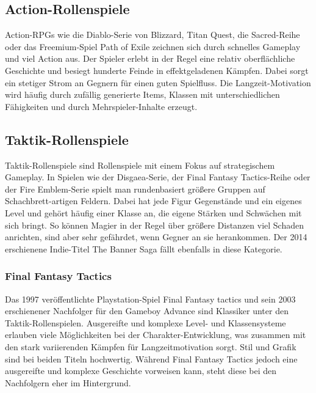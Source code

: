 \documentclass[extern,palatino]{cgBA}
\begin{document}
	\subsection{Action-Rollenspiele}
	Action-RPGs wie die Diablo-Serie von Blizzard, Titan Quest, die Sacred-Reihe oder das Freemium-Spiel Path of Exile zeichnen sich durch schnelles Gameplay und viel Action aus. Der Spieler erlebt in der Regel eine relativ oberflächliche Geschichte und besiegt hunderte Feinde in effektgeladenen Kämpfen. Dabei sorgt ein stetiger Strom an Gegnern für einen guten Spielfluss. Die Langzeit-Motivation wird häufig durch zufällig generierte Items, Klassen mit unterschiedlichen Fähigkeiten und durch Mehrspieler-Inhalte erzeugt.
	\subsection{Taktik-Rollenspiele}
	Taktik-Rollenspiele sind Rollenspiele mit einem Fokus auf strategischem Gameplay. In Spielen wie der Disgaea-Serie, der Final Fantasy Tactics-Reihe oder der Fire Emblem-Serie spielt man rundenbasiert größere Gruppen auf Schachbrett-artigen Feldern. Dabei hat jede Figur Gegenstände und ein eigenes Level und gehört häufig einer Klasse an, die eigene Stärken und Schwächen mit sich bringt. So können Magier in der Regel über größere Distanzen viel Schaden anrichten, sind aber sehr gefährdet, wenn Gegner an sie herankommen. Der 2014 erschienene Indie-Titel The Banner Saga fällt ebenfalls in diese Kategorie.
	\subsubsection{Final Fantasy Tactics}
	Das 1997 veröffentlichte Playstation-Spiel Final Fantasy tactics und sein 2003 erschienener Nachfolger für den Gameboy Advance sind Klassiker unter den Taktik-Rollenspielen. Ausgereifte und komplexe Level- und Klassensysteme\cite{trpgffwiki} erlauben viele Möglichkeiten bei der Charakter-Entwicklung, was zusammen mit den stark variierenden Kämpfen für Langzeitmotivation sorgt. Stil und Grafik sind bei beiden Titeln hochwertig. Während Final Fantasy Tactics jedoch eine ausgereifte und komplexe Geschichte vorweisen kann, steht diese bei den Nachfolgern eher im Hintergrund.
\end{document}
